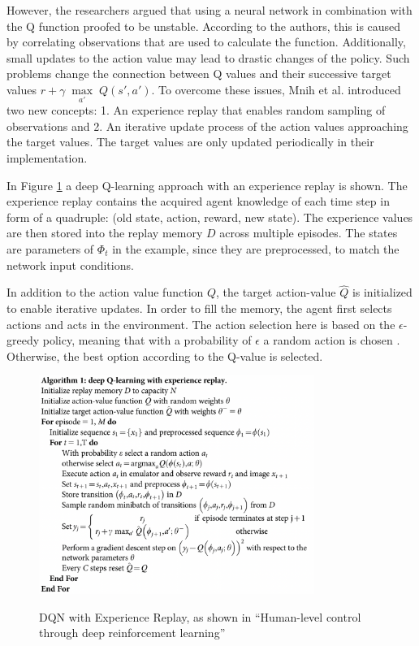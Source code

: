 However, the researchers argued that using a neural network in combination with the Q function proofed to be unstable. According to the authors, this is caused by correlating observations that are used to calculate the function. Additionally, small updates to the action value may lead to drastic changes of the policy. Such problems change the connection between Q values and their successive target values $r+\gamma \; \underset{a'} \max \; Q(s',a')$. To overcome these issues, Mnih et al. introduced two new concepts: 1. An experience replay that enables random sampling of observations and 2. An iterative update process of the action values approaching the target values. The target values are only updated periodically in their implementation.

In Figure \ref{fig:dqn_algo_code} a deep Q-learning approach with an experience replay is shown. The experience replay contains the acquired agent knowledge of each time step in form of a quadruple: (old state, action, reward, new state). The experience values are then stored into the replay memory $D$ across multiple episodes. The states are parameters of $\Phi_{t}$ in the example, since they are preprocessed, to match the network input conditions.

In addition to the action value function $Q$, the target action-value $\hat Q$ is initialized to enable iterative updates. In order to fill the memory, the agent first selects actions and acts in the environment. The action selection here is based on the $\epsilon$-greedy policy, meaning that with a probability of $\epsilon$ a random action is chosen \cite{mnka15}. Otherwise, the best option according to the Q-value is selected.

\begin{figure}[hpbt]
    \centering
    \includegraphics[width=0.8\textwidth]{pictures/dqn_algo_code.png}\\
    \caption[DQN with Experience Replay]{DQN with Experience Replay, as shown in ``Human-level control through deep reinforcement learning'' \cite{mnka15}}\label{fig:dqn_algo_code}
\end{figure}

